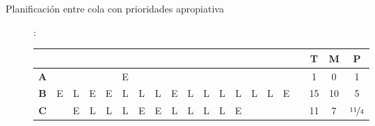 \begin{ejercicio}
    \begin{description}
        \item[Planificación entre cola con prioridades apropiativa]:
        \begin{table}[H]
            \begin{tabular}{ccccccccccccccccc|ccc}
                                            &                        &                                &                                &                                &                          &                        &                                &                                &                                &                          &                         &                                &                                &                                &                         &    & \textbf{T} & \textbf{M} & \textbf{P} \\ \hline
            \multicolumn{1}{c|}{\textbf{A}} &                        &                                &                                &                                & E                        &                        &                                &                                &                                &                          &                         &                                &                                &                                &                         &    & 1          & 0          & 1          \\ \hline
            \multicolumn{1}{c|}{\textbf{B}} & E                      & {\color[HTML]{F56B00} L}       & E                              & E                              & {\color[HTML]{FE0000} L} & L                      & L                              & E                              & L                              & L                        & L                       & L                              & L                              & L                              & E                       &    & 15         & 10         & 5          \\ \hline
            \multicolumn{1}{c|}{\textbf{C}} &                        & E                              & {\color[HTML]{F56B00} L}       & L                              & L                        & E                      & E                              & {\color[HTML]{FE0000} L}       & L                              & L                        & L                       & E                              &                                &                                &                         &    & 11         & 7          & $\nicefrac{11}{4}$       \\ \hline

\end{tabular}
\end{table}
\end{description}
\end{ejercicio}
